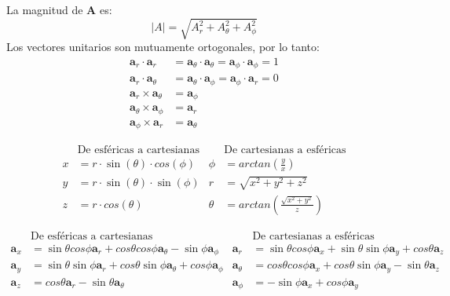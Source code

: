 \documentclass[11pt,fleqn]{book} %
\begin{document}
La magnitud de \textbf{A} es:
\begin{equation}
|A|=\sqrt{A_r^2+A_{\theta}^2+A_{\phi}^2}
\end{equation}
Los vectores unitarios son mutuamente ortogonales, por lo tanto:
\begin{align*}
\textbf{a}_r\cdot\textbf{a}_r&=\textbf{a}_{\theta}\cdot\textbf{a}_{\theta}=\textbf{a}_{\phi}\cdot\textbf{a}_{\phi}=1\\
\textbf{a}_r\cdot\textbf{a}_{\theta}&=\textbf{a}_{\theta}\cdot\textbf{a}_{\phi}=\textbf{a}_{\phi}\cdot\textbf{a}_r=0\\
\textbf{a}_r\times\textbf{a}_{\theta}&=\textbf{a}_{\phi}\\
\textbf{a}_{\theta}\times\textbf{a}_{\phi}&=\textbf{a}_r\\
\textbf{a}_{\phi}\times\textbf{a}_r&=\textbf{a}_{\theta}
\end{align*}
\begin{proposition}
\begin{align*}
&\text{De esféricas a cartesianas}   &&  \text{De cartesianas a esféricas}  \\
    x&=r\cdot \sin(\theta)\cdot cos(\phi)  &  \phi&=arctan\left(\frac{y}{x}\right) \\
    y&=r\cdot \sin(\theta)\cdot \sin(\phi) & r&=\sqrt{x^2+y^2+z^2}\\
    z&=r\cdot cos(\theta) & \theta&=arctan\left(\frac{\sqrt{x^2+y^2}}{z}\right)
\end{align*}
\end{proposition}
\begin{proposition}\label{prop:vecunitarioscaresf}
\begin{align*}
&\text{De esféricas a cartesianas}   &&  \text{De cartesianas a esféricas}  \\
    \textbf{a}_x&=\sin\theta cos\phi\textbf{a}_r + cos\theta cos\phi \textbf{a}_{\theta}-\sin\phi\textbf{a}_{\phi} &  \textbf{a}_r&=\sin\theta cos\phi\textbf{a}_x + \sin\theta \sin\phi \textbf{a}_y + cos\theta\textbf{a}_z\\
    \textbf{a}_y&=\sin\theta \sin\phi\textbf{a}_r + cos\theta \sin\phi \textbf{a}_{\theta} + cos\phi\textbf{a}_{\phi} & \textbf{a}_{\theta}&=cos\theta cos\phi\textbf{a}_x + cos\theta \sin\phi \textbf{a}_y - \sin\theta\textbf{a}_z\\
    \textbf{a}_z&=cos\theta\textbf{a}_r - \sin\theta\textbf{a}_{\theta} & \textbf{a}_{\phi}&=-\sin\phi\textbf{a}_x + cos\phi\textbf{a}_y
\end{align*}
\end{proposition}
\end{document}
